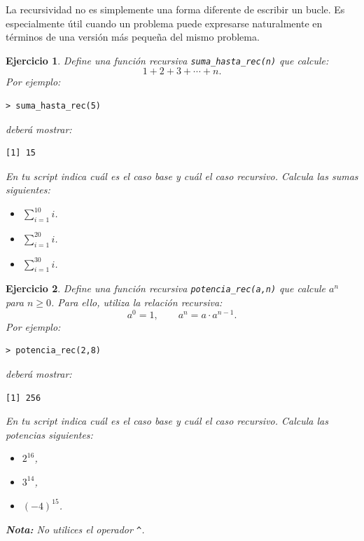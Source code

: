 \documentclass[11pt,a4paper]{article}
\theoremstyle{exercise}
\newtheorem{exercise}{Ejercicio}
\begin{document}
La recursividad no es simplemente una forma diferente de escribir un bucle. Es especialmente útil cuando un problema puede expresarse naturalmente en términos de una versión más pequeña del mismo problema.



\begin{exercise} Define una función recursiva \texttt{suma\_hasta\_rec(n)} que calcule: 
\[ 1+2+3+\cdots+n. \]
Por ejemplo:
\begin{lstlisting}[style=rconsole]
> suma_hasta_rec(5)
\end{lstlisting}	
deberá mostrar:
\begin{lstlisting}[style=routput]
[1] 15
\end{lstlisting}
En tu script indica cuál es el caso base y cuál el caso recursivo. Calcula las sumas siguientes:
\begin{itemize}
	\item $\sum_{i=1}^{10} i$.
	\item $\sum_{i=1}^{20} i$.
	\item $\sum_{i=1}^{30} i$.
\end{itemize}
\end{exercise}



\begin{exercise} Define una función recursiva \texttt{potencia\_rec(a,n)} que calcule $a^n$ para $n \geq 0$. Para ello, utiliza la relación recursiva: 
\[ a^0=1,\qquad a^n=a\cdot a^{n-1}. \]
Por ejemplo:
\begin{lstlisting}[style=rconsole]
> potencia_rec(2,8)
\end{lstlisting}	
deberá mostrar:
\begin{lstlisting}[style=routput]
[1] 256
\end{lstlisting}
En tu script indica cuál es el caso base y cuál el caso recursivo. Calcula las potencias siguientes:
\begin{itemize}
	\item $2^{16}$,
	\item $3^{14}$,
	\item $(-4)^{15}$.
\end{itemize}
\noindent \textbf{Nota:} No utilices el operador \texttt{\^}. 
\end{exercise}
\end{document}
